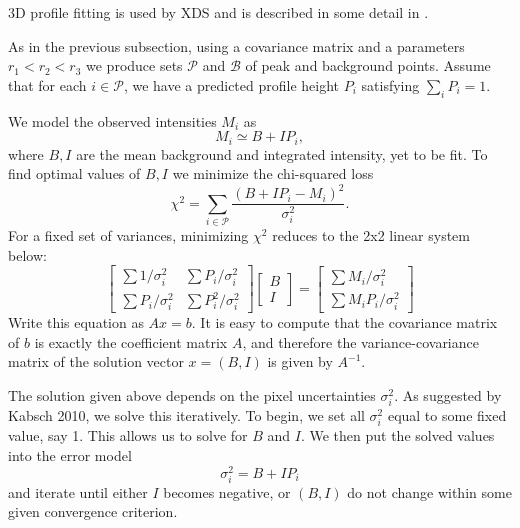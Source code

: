 \documentclass[twocolumn,preprintnumbers,amsmath,amssymb]{revtex4}
\newcommand{\calP}{\mathcal{P}}
\newcommand{\calB}{\mathcal{B}}
\begin{document}
3D profile fitting is used by XDS \cite{xds-2010} and is described in some detail in \cite{kabsch-1988, kabsch-2010}.

As in the previous subsection, using a covariance matrix and a parameters $r_1 < r_2 < r_3$ we produce sets $\calP$ and $\calB$ of peak and background points. Assume that for each $i \in \calP$, we have a predicted profile height $P_i$ satisfying $\sum_i P_i = 1$.

We model the observed intensities $M_i$ as
\begin{equation} M_i \simeq B + I P_i, \end{equation}
where $B, I$ are the mean background and integrated intensity, yet to be fit. To find optimal values of $B,I$ we minimize the chi-squared loss
\begin{equation} \chi^2 = \sum_{i \in \calP} \frac{(B+IP_i - M_i)^2}{\sigma^2_i}. \end{equation}
For a fixed set of variances, minimizing $\chi^2$ reduces to the 2x2 linear system below:
\begin{equation} \begin{bmatrix}
  \sum 1/\sigma^2_i & \sum P_i / \sigma^2_i \\
  \sum P_i/\sigma_i^2 & \sum P_i^2 / \sigma^2_i
\end{bmatrix}
\begin{bmatrix} B \\ I \end{bmatrix}
 = \begin{bmatrix} \sum M_i/\sigma^2_i \\ \sum M_i P_i / \sigma^2_i \end{bmatrix} \end{equation}
 Write this equation as $Ax = b$. It is easy to compute that the covariance matrix of $b$ is exactly the coefficient matrix
 $A$, and therefore the variance-covariance matrix of the solution vector $x = (B, I)$ is given by $A^{-1}$.

The solution given above depends on the pixel uncertainties $\sigma_i^2$. As suggested by Kabsch 2010, we solve this iteratively. To begin, we set all $\sigma^2_i$ equal to some fixed value, say 1. This allows us to solve for $B$ and $I$. We then put the solved values into the error model
\begin{equation} \sigma_i^2 = B + I P_i \end{equation}
and iterate until either $I$ becomes negative, or $(B, I)$ do not change within some given convergence criterion.
\end{document}
